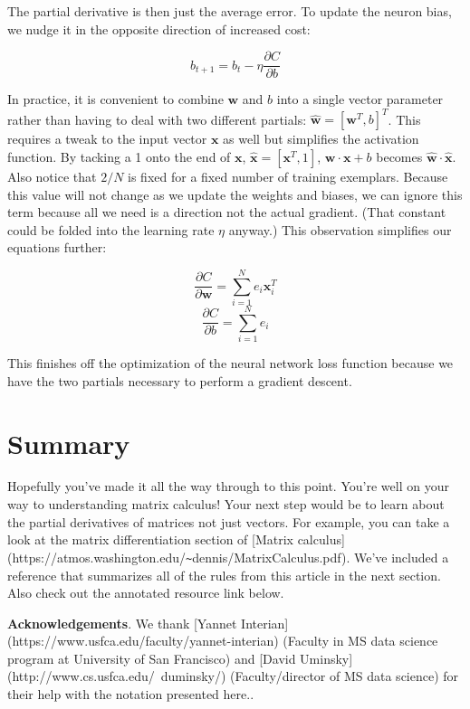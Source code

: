 \documentclass[11pt]{article}
\begin{document}
The partial derivative is then just the average error. To update the neuron bias, we nudge it in the opposite direction of increased cost:

\[
b_{t+1} = b_{t} - \eta \frac{\partial C}{\partial b}
\]
 
In practice, it is convenient to combine $\mathbf{w}$ and $b$ into a single vector parameter rather than having to deal with two different partials: $\hat{\mathbf{w}} = [\mathbf{w}^T, b]^T$. This requires a tweak to the input vector $\mathbf{x}$ as well but simplifies the activation function. By tacking a 1 onto the end of $\mathbf{x}$, $\hat{\mathbf{x}} = [\mathbf{x}^T,1]$, $\mathbf{w} \cdot \mathbf{x} + b$ becomes $\hat{\mathbf{w}} \cdot \hat{\mathbf{x}}$.  Also notice that $2/N$ is fixed for a fixed number of training exemplars. Because this value will not change as we update the weights and biases, we can ignore this term because all we need is a direction not the actual gradient. (That constant could be folded into the learning rate $\eta$ anyway.) This observation simplifies our equations further:

\[\frac{\partial C}{\partial \mathbf{w}} = \sum_{i=1}^N e_i\mathbf{x}_i^T\]
\[\frac{\partial C}{\partial b} = \sum_{i=1}^N e_i\]

This finishes off the optimization of the neural network loss function because we have the two partials necessary to perform a gradient descent.

\section{Summary}

Hopefully you've made it all the way through to this point.  You're well on your way to understanding matrix calculus!  Your next step would be to learn about the partial derivatives of matrices not just vectors. For example, you can take a look at the matrix differentiation section of [Matrix calculus](https://atmos.washington.edu/\verb|~|dennis/MatrixCalculus.pdf). We've included a reference that summarizes all of the rules from this article in the next section. Also check out the annotated resource link below.

{\bf Acknowledgements}. We thank [Yannet Interian](https://www.usfca.edu/faculty/yannet-interian) (Faculty in MS data science program at University of San Francisco) and [David Uminsky](http://www.cs.usfca.edu/~duminsky/) (Faculty/director of MS data science) for their help with the notation presented here..
\end{document}
